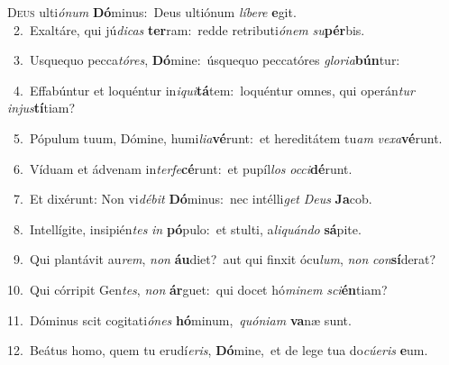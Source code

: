 \lettrine{\initial\textcolor{\initialcolor}{D}}{eus} ulti\-\textit{ó}\-\textit{num} \textbf{Dó}\-minus:~\star Deus ultiónum \textit{lí}\-\textit{be}\textit{re} \textbf{e}\-git.\\
{\numbfont\textcolor{\numbcolor}{~2.}}~Exaltáre, qui jú\-\textit{di}\-\textit{cas} \textbf{ter}\-ram:~\star redde retributi\-\textit{ó}\-\textit{nem} \textit{su}\-\textbf{pér}bis.\par
{\numbfont\textcolor{\numbcolor}{~3.}}~Usquequo pecca\-\textit{tó}\-\textit{res}, \textbf{Dó}\-mine:~\star úsquequo peccatóres \textit{glo}\-\textit{ri}\textit{a}\textbf{bún}tur:\par
{\numbfont\textcolor{\numbcolor}{~4.}}~Effabúntur et loquéntur in\-\textit{i}\-\textit{qui}\textbf{tá}tem:~\star loquéntur omnes, qui operán\textit{tur} \textit{in}\-\textit{jus}\textbf{tí}tiam?\par
{\numbfont\textcolor{\numbcolor}{~5.}}~Pópulum tuum, Dómine, humi\-\textit{li}\-\textit{a}\textbf{vé}runt:~\star et hereditátem tu\textit{am} \textit{ve}\-\textit{xa}\textbf{vé}runt.\par
{\numbfont\textcolor{\numbcolor}{~6.}}~Víduam et ádvenam in\-\textit{ter}\-\textit{fe}\textbf{cé}runt:~\star et pupíl\textit{los} \textit{oc}\-\textit{ci}\textbf{dé}runt.\par
{\numbfont\textcolor{\numbcolor}{~7.}}~Et dixérunt: Non vi\-\textit{dé}\-\textit{bit} \textbf{Dó}\-minus:~\star nec intélli\textit{get} \textit{De}\-\textit{us} \textbf{Ja}\-cob.\par
{\numbfont\textcolor{\numbcolor}{~8.}}~Intellígite, insipién\textit{tes} \textit{in} \textbf{pó}\-pulo:~\star et stulti, a\-\textit{li}\-\textit{quán}\textit{do} \textbf{sá}\-pite.\par
{\numbfont\textcolor{\numbcolor}{~9.}}~Qui plantávit au\-\textit{rem}\-, \textit{non} \textbf{áu}\-diet?~\star aut qui finxit ócu\-\textit{lum}\-, \textit{non} \textit{con}\-\textbf{sí}derat?\par
{\numbfont\textcolor{\numbcolor}{10.}}~Qui córripit Gen\-\textit{tes}\-, \textit{non} \textbf{ár}\-guet:~\star qui docet hó\-\textit{mi}\-\textit{nem} \textit{sci}\-\textbf{én}tiam?\par
{\numbfont\textcolor{\numbcolor}{11.}}~Dóminus scit cogitati\-\textit{ó}\-\textit{nes} \textbf{hó}\-minum,~\star \textit{quón}\-\textit{i}\textit{am} \textbf{va}\-næ sunt.\par
{\numbfont\textcolor{\numbcolor}{12.}}~Beátus homo, quem tu erudí\-\textit{e}\-\textit{ris}, \textbf{Dó}\-mine,~\star et de lege tua do\-\textit{cú}\-\textit{e}\textit{ris} \textbf{e}\-um.\par
